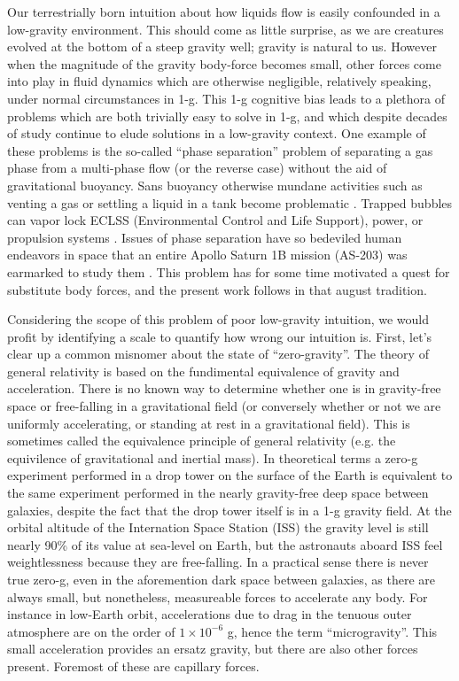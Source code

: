 \documentclass[10pt,a4paper]{article}
\begin{document}
Our terrestrially born intuition about how liquids flow is easily confounded in a low-gravity environment. This should come as little surprise, as we are creatures evolved at the bottom of a steep gravity well; gravity is natural to us. However when the magnitude of the gravity body-force becomes small, other forces come into play in fluid dynamics which are otherwise negligible, relatively speaking, under normal circumstances in 1-g. This 1-g cognitive bias leads to a plethora of problems which are both trivially easy to solve in 1-g, and which despite decades of study continue to elude solutions in a low-gravity context. One example of these problems is the so-called ``phase separation'' problem of separating a gas phase from a multi-phase flow (or the reverse case) without the aid of gravitational buoyancy. Sans buoyancy otherwise mundane activities such as venting a gas or settling a liquid in a tank become problematic \cite{petrash_controlling_1964}. Trapped bubbles can vapor lock ECLSS (Environmental Control and Life Support), power, or propulsion systems \cite{jenson_passive_2014}. Issues of phase separation have so bedeviled human endeavors in space that an entire Apollo Saturn 1B mission (AS-203) was earmarked to study them \cite{hastings_[saturn_1965}. This problem has for some time motivated a quest for substitute body forces, and the present work follows in that august tradition.

Considering the scope of this problem of poor low-gravity intuition, we would profit by identifying a scale to quantify how wrong our intuition is. First, let's clear up a common misnomer about the state of ``zero-gravity''. The theory of general relativity is based on the fundimental equivalence of gravity and acceleration. There is no known way to determine whether one is in gravity-free space or free-falling in a gravitational field (or conversely whether or not we are uniformly accelerating, or standing at rest in a gravitational field). This is sometimes called the equivalence principle of general relativity (e.g. the equivilence of gravitational and inertial mass). In theoretical terms a zero-g experiment performed in a drop tower on the surface of the Earth is equivalent to the same experiment performed in the nearly gravity-free deep space between galaxies, despite the fact that the drop tower itself is in a 1-g gravity field. At the orbital altitude of the Internation Space Station (ISS) the gravity level is still nearly 90\% of its value at sea-level on Earth, but the astronauts aboard ISS feel weightlessness because they are free-falling. In a practical sense there is never true zero-g, even in the aforemention dark space between galaxies, as there are always small, but nonetheless, measureable forces to accelerate any body. For instance in low-Earth orbit, accelerations due to drag in the tenuous outer atmosphere are on the order of $1 \times 10^{-6}$ g, hence the term ``microgravity''. This small acceleration provides an ersatz gravity, but there are also other forces present. Foremost of these are capillary forces. 
\end{document}
